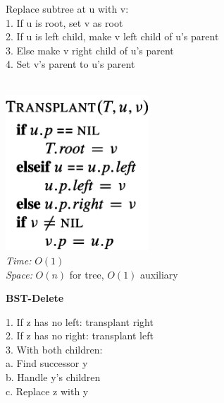 {\begin{minipage}[t]{1\textwidth}
\begin{minipage}[t]{0.19\textwidth}
       \tiny
        \begin{minipage}[t]{\textwidth}
           \tiny
            Replace subtree at u with v:\\
            1. If u is root, set v as root\\
            2. If u is left child, make v left child of u's parent\\
            3. Else make v right child of u's parent\\
            4. Set v's parent to u's parent
        \end{minipage}\\[4pt]
        \includegraphics[width=0.4\textwidth]{images/bst-transplant.png}\\[2pt]
        \textit{Time:} \(O(1)\)\\
        \textit{Space:} \(O(n)\) for tree, \(O(1)\) auxiliary
    \end{minipage}
    \hfill
    \begin{minipage}[t]{0.19\textwidth}
        \centering
        \textbf{\scriptsize BST-Delete}\\[2pt]
       \tiny
        \begin{minipage}[t]{\textwidth}
           \tiny
            1. If z has no left: transplant right\\
            2. If z has no right: transplant left\\
            3. With both children:\\
            \quad a. Find successor y\\
            \quad b. Handle y's children\\
            \quad c. Replace z with y
        \end{minipage}\\[4pt]

\end{minipage}
\end{minipage}}
